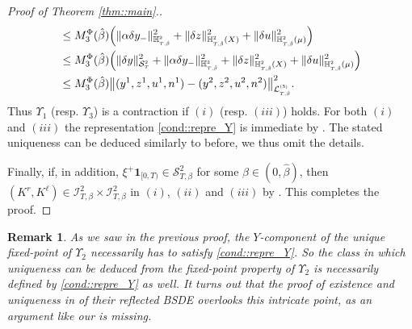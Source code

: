 \documentclass[10pt]{article} %
\newtheorem{remark}[theorem]{Remark}
\newcommand\cI{\mathcal I}
\newcommand\cL{\mathcal L}
\newcommand\cS{\mathcal S}
\newcommand{\smalltext}[1]{\text{\fontsize{4}{4}\selectfont$#1$}}
\def \H{\mathbb{H}}
\newcommand{\1}{\mathbf{1}}
\begin{document}
\begin{proof}[Proof of Theorem \ref{thm::main}.]
\begin{align*}
		&\leq M^\Phi_3(\hat\beta) \Big(\|\alpha\delta y_-\|^2_{\H^\smalltext{2}_{\smalltext{T}\smalltext{,}\smalltext{\hat\beta}}} + \|\delta z\|^2_{\H^\smalltext{2}_{\smalltext{T}\smalltext{,}\smalltext{\hat\beta}}(X)} + \|\delta u\|^2_{\H^\smalltext{2}_{\smalltext{T}\smalltext{,}\smalltext{\hat\beta}}(\mu)} \Big)  \nonumber\\
		&\leq M^\Phi_3(\hat\beta) \Big( \|\delta y\|^2_{\cS^\smalltext{2}_\smalltext{T}} + \|\alpha\delta y_-\|^2_{\H^\smalltext{2}_{\smalltext{T}\smalltext{,}\smalltext{\hat\beta}}} + \|\delta z\|^2_{\H^\smalltext{2}_{\smalltext{T}\smalltext{,}\smalltext{\hat\beta}}(X)} + \|\delta u\|^2_{\H^\smalltext{2}_{\smalltext{T}\smalltext{,}\smalltext{\hat\beta}}(\mu)} \Big)  \nonumber\\
		&\leq M^\Phi_3(\hat\beta)\big\|(y^1, z^1, u^1, n^1) - (y^2, z^2, u^2, n^2)\big\|^2_{\cL^\smalltext{(3)}_{\smalltext{T}\smalltext{,}\smalltext{\hat\beta}}}.
	\end{align*} 
	Thus $\Upsilon_1$ (resp. $\Upsilon_3$) is a contraction if $(i)$ (resp. $(iii)$) holds. For both $(i)$ and $(iii)$ the representation \ref{cond::repre_Y} is immediate by . The stated uniqueness can be deduced similarly to before, we thus omit the details.
	
	\medskip
	Finally, if, in addition, $\xi^{+}\mathbf{1}_{[0,T)} \in \cS^2_{T,\beta}$ for some $\beta \in (0,\hat\beta)$, then $(K^r,K^\ell) \in \cI^2_{T,\beta} \times \cI^2_{T,\beta}$ in $(i)$, $(ii)$ and $(iii)$ by . This completes the proof.
\end{proof}


\begin{remark}\label{rem::missing_pieces}
	As we saw in the previous proof, the $Y$-component of the unique fixed-point of $\Upsilon_2$ necessarily has to satisfy \ref{cond::repre_Y}. So the class in which uniqueness can be deduced from the fixed-point property of $\Upsilon_2$ is necessarily defined by \ref{cond::repre_Y} as well. It turns out that the proof of existence and uniqueness in {\rm\cite{grigorova2020optimal}} of their reflected {\rm BSDE} overlooks this intricate point, as an argument like our {\rm{}} is missing.
\end{remark}
\end{document}

